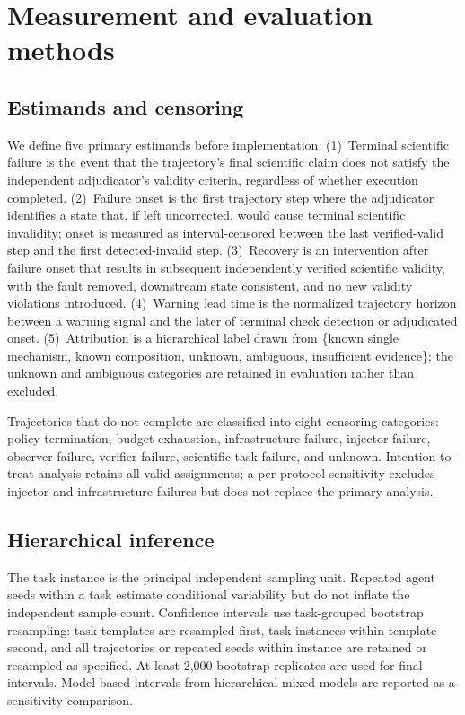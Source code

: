 \section{Measurement and evaluation methods}
\label{sec:methods}

\subsection{Estimands and censoring}

We define five primary estimands before implementation. (1)~Terminal
scientific failure is the event that the trajectory's final scientific
claim does not satisfy the independent adjudicator's validity criteria,
regardless of whether execution completed. (2)~Failure onset is the first
trajectory step where the adjudicator identifies a state that, if left
uncorrected, would cause terminal scientific invalidity; onset is measured
as interval-censored between the last verified-valid step and the first
detected-invalid step. (3)~Recovery is an intervention after failure onset
that results in subsequent independently verified scientific validity, with
the fault removed, downstream state consistent, and no new validity
violations introduced. (4)~Warning lead time is the normalized trajectory
horizon between a warning signal and the later of terminal check detection
or adjudicated onset. (5)~Attribution is a hierarchical label drawn from
\{known single mechanism, known composition, unknown, ambiguous,
insufficient evidence\}; the unknown and ambiguous categories are retained
in evaluation rather than excluded.

Trajectories that do not complete are classified into eight censoring
categories: policy termination, budget exhaustion, infrastructure failure,
injector failure, observer failure, verifier failure, scientific task
failure, and unknown. Intention-to-treat analysis retains all valid
assignments; a per-protocol sensitivity excludes injector and
infrastructure failures but does not replace the primary analysis.

\subsection{Hierarchical inference}

The task instance is the principal independent sampling unit. Repeated
agent seeds within a task estimate conditional variability but do not
inflate the independent sample count. Confidence intervals use
task-grouped bootstrap resampling: task templates are resampled first, task
instances within template second, and all trajectories or repeated seeds
within instance are retained or resampled as specified. At least 2{,}000
bootstrap replicates are used for final intervals. Model-based intervals
from hierarchical mixed models are reported as a sensitivity comparison.

